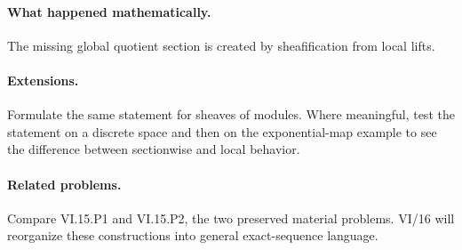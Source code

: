 \paragraph{What happened mathematically.}
The missing global quotient section is created by sheafification from local lifts.

\paragraph{Extensions.}
Formulate the same statement for sheaves of modules.  Where meaningful, test the statement on a discrete space and then on the exponential-map example to see the difference between sectionwise and local behavior.

\paragraph{Related problems.}
Compare VI.15.P1 and VI.15.P2, the two preserved material problems.  VI/16 will reorganize these constructions into general exact-sequence language.
\fi
